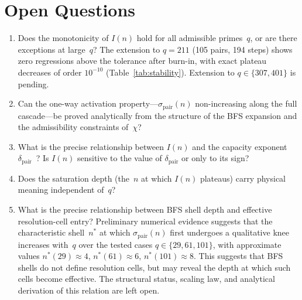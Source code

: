 \documentclass[11pt,a4paper]{article}
\begin{document}
  \section{Open Questions}
  \label{sec:open}

  \begin{enumerate}

    \item Does the monotonicity of $I(n)$ hold for all admissible
    primes~$q$, or are there exceptions at large~$q$?
    The extension to $q = 211$ (105 pairs, 194 steps) shows zero regressions
    above the tolerance after burn-in, with exact plateau decreases of order
    $10^{-10}$ (Table~\ref{tab:stability}).
    Extension to $q \in \{307, 401\}$ is pending.

    \item Can the one-way activation property---$\sigma_{\mathrm{pair}}(n)$
    non-increasing along the full cascade---be proved analytically from
    the structure of the BFS expansion and the admissibility constraints
    of~$\chi$?

    \item What is the precise relationship between $I(n)$ and the capacity
    exponent $\delta_{\mathrm{pair}}$~\cite{Beau2026a29}?
    Is $I(n)$ sensitive to the value of $\delta_{\mathrm{pair}}$ or only
    to its sign?

    \item Does the saturation depth (the~$n$ at which $I(n)$ plateaus)
    carry physical meaning independent of~$q$?

    \item What is the precise relationship between BFS shell depth and
    effective resolution-cell entry?
    Preliminary numerical evidence suggests that the characteristic
    shell~$n^*$ at which $\sigma_{\mathrm{pair}}(n)$ first undergoes a
    qualitative knee increases with~$q$ over the tested cases
    $q \in \{29, 61, 101\}$, with approximate values
    $n^*(29) \approx 4$, $n^*(61) \approx 6$, $n^*(101) \approx 8$.
    This suggests that BFS shells do not define resolution cells, but
    may reveal the depth at which such cells become effective.
    The structural status, scaling law, and analytical derivation of
    this relation are left open.


\end{enumerate}
\end{document}
